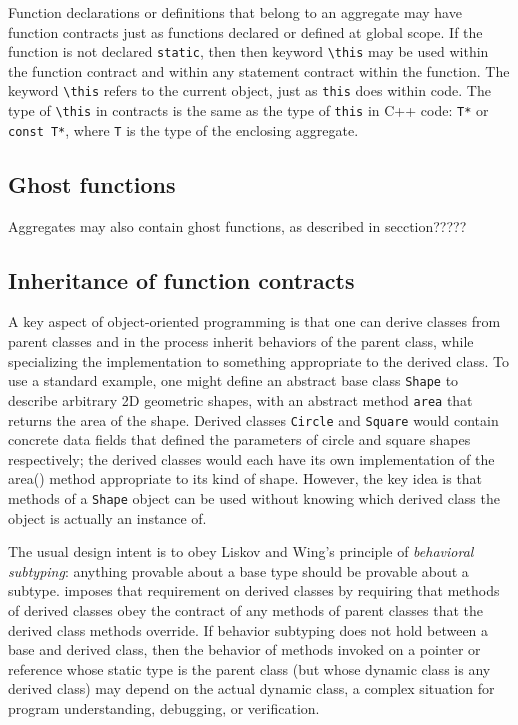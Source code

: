 Function declarations or definitions that belong to an aggregate may have function
contracts just as functions declared or defined at global scope. If the function is not declared \lstinline|static|, then
then keyword \lstinline|\this| may be used within the function
contract and within any statement contract within the 
function. The keyword \lstinline|\this| refers to the current
object, just as \lstinline|this| does within \lang code.
The type of \lstinline|\this| in contracts is the same as the type of \lstinline|this| in C++ code: \lstinline|T*| or \lstinline|const T*|, where \lstinline|T| is the type of the enclosing aggregate.

\subsection{Ghost functions}
Aggregates may also contain ghost functions, as described in secction????? 


\subsection{Inheritance of function contracts}

A key aspect of object-oriented programming is 
that one can derive classes from parent classes and in 
the process inherit behaviors of the parent class, 
while specializing the implementation to something appropriate to the derived class. 
To use a standard example, 
one might define an abstract base class \lstinline|Shape| to describe arbitrary 2D geometric shapes, 
with an abstract method 
\lstinline|area| that returns the area of the shape. 
Derived classes \lstinline|Circle| and \lstinline|Square| would contain concrete data fields that defined the parameters of circle and square shapes respectively; 
the derived classes would each have its own implementation of the area() method appropriate to its kind of shape. 
However, the key idea is that methods of a \lstinline|Shape| object can be used without knowing which derived class the object is actually an instance of.

The usual design intent is to obey Liskov and Wing's principle of \textit{behavioral subtyping}\cite{Liskov:1994:BNS:197320.197383}: 
anything provable about a base type should be provable about a subtype.
\NAME{} imposes that requirement on derived classes by 
requiring that methods of derived classes obey the contract of any methods of parent classes that the derived class methods override. 
If behavior subtyping does not hold between a base and derived class, then the behavior of methods
invoked on a pointer or reference whose static type is the
parent class (but whose dynamic class is any derived class) may depend on the actual dynamic class, 
a complex situation for program understanding, debugging, or verification.

